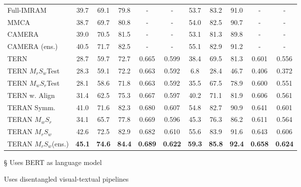 \documentclass[acmsmall]{acmart}
\newcommand{\majorrevised}[1]{#1}
\begin{document}
\begin{table}[t]
\begin{threeparttable}
\begin{tabular}{LCCCCCCCCCC}
Full-IMRAM \cite{Chen2020imram} &  39.7 & 69.1 & 79.8 & - & - & 53.7 & 83.2 & 91.0 & - & - \\
\majorrevised{MMCA \cite{wei2020multi} \tnote{\S}} & \majorrevised{38.7} & \majorrevised{69.7} & \majorrevised{80.8} & - & - & \majorrevised{54.0} & \majorrevised{82.5} & \majorrevised{90.7} & - & - \\
\majorrevised{CAMERA \cite{qu2020context} \tnote{\S} \tnote{\textdagger}} & \majorrevised{39.0} & \majorrevised{70.5} & \majorrevised{81.5} & - & - & \majorrevised{53.1} & \majorrevised{81.3} & \majorrevised{89.8} & - & - \\
\majorrevised{CAMERA (ens.) \cite{qu2020context} \tnote{\S} \tnote{\textdagger}} & \majorrevised{40.5} & \majorrevised{71.7} & \majorrevised{82.5} & - & - & \majorrevised{55.1} & \majorrevised{82.9} & \majorrevised{91.2} & - & - \\

\midrule
TERN \cite{messina2020tern} & 28.7 & 59.7 & 72.7 & 0.665 & 0.599 & 38.4 & 69.5 & 81.3 & 0.601 & 0.556\\
TERN $M_{r}S_{w}$Test & 28.3 & 59.1 & 72.2 & 0.663 & 0.592 & 6.8 & 28.4 & 46.7 & 0.406 & 0.372 \\
TERN $M_{w}S_{r}$Test & 28.1 & 58.6 & 71.8 & 0.663 & 0.592 & 35.5 & 67.5 & 78.9 & 0.600 & 0.551 \\
TERN w. Align & 31.4 & 62.5 & 75.3 & 0.667 & 0.597 & 40.2 & 71.1 & 81.9 & 0.606 & 0.561 \\
\midrule
TERAN Symm. & 41.0 & 71.6 & 82.3 & 0.680 & 0.607 & 54.8 & 82.7 & 90.9 & 0.641 & 0.601\\
TERAN $M_{w}S_{r}$ & 34.1 & 65.7 & 77.8 & 0.669 & 0.596 & 45.3 & 76.3 & 86.2 & 0.611 & 0.564\\
TERAN $M_{r}S_{w}$ & 42.6 & 72.5 & 82.9 & 0.682 & 0.610 & 55.6 & 83.9 & 91.6 & 0.643 & 0.606 \\
\majorrevised{TERAN $M_{r}S_{w}$(ens.)} & \majorrevised{\textbf{45.1}} & \majorrevised{\textbf{74.6}} & \majorrevised{\textbf{84.4}} & \majorrevised{\textbf{0.689}} & \majorrevised{\textbf{0.622}} & \majorrevised{\textbf{59.3}} & \majorrevised{\textbf{85.8}} & \majorrevised{\textbf{92.4}} & \majorrevised{\textbf{0.658}} & \majorrevised{\textbf{0.624}} \\
\bottomrule
\end{tabular}
\label{tab:results_mscoco_5k}
\begin{tablenotes}
    \item[\S] Uses BERT as language model
    \item[\textdagger] Uses disentangled visual-textual pipelines
\end{tablenotes}
\end{threeparttable}
\end{table}
\end{document}
